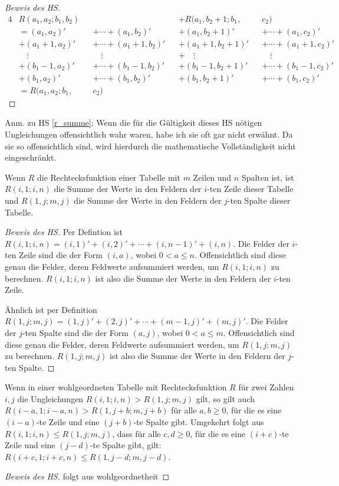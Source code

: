 \begin{proof}[Beweis des HS]
\begin{alignat*}{4}
        &R(a_1, a_2; b_1, b_2)&& &&+R(a_1, b_2+1; b_1, &&c_2)\\
        &=(a_1, a_2)' &&+\cdots+ (a_1, b_2)'
        &&+(a_1, b_2+1)'&&+\cdots+(a_1, c_2)'\\
        &+(a_1+1, a_2)'&&+\cdots+ (a_1+1, b_2)'
        &&+(a_1+1, b_2+1)'&&+\cdots+(a_1+1, c_2)'\\
        & \quad\vdots&&\quad\vdots&&+\quad\vdots&&\quad\vdots\\
        &+(b_1-1, a_2)'&&+\cdots + (b_1-1, b_2)'
        &&+(b_1-1, b_2+1)'&&+\cdots+(b_1-1, c_2)'\\
        &+(b_1, a_2)'&&+ \cdots + (b_1, b_2)'
        &&+(b_1, b_2+1)'&&+\cdots+(b_1, c_2)'\\
        &=R(a_1, a_2; b_1, &&c_2)
    \end{alignat*}
\end{proof}
Anm.  zu HS \ref{r_summe}: Wenn die für die Gültigkeit dieses HS nötigen Ungleichungen offensichtlich wahr waren, 
habe ich sie oft gar nicht erwähnt. Da sie so offensichtlich sind, wird hierdurch die mathematische Vollständigkeit 
nicht eingeschränkt.
\begin{lem}\label{r_zeile_spalte}
    Wenn $R$ die Rechtecksfunktion einer Tabelle mit $m$ Zeilen und $n$ Spalten ist, ist $R(i, 1; i, n)$ die Summe 
    der Werte in den Feldern der $i$-ten Zeile dieser Tabelle und $R(1, j; m, j)$ die Summe der Werte in den Feldern 
    der $j$-ten Spalte dieser Tabelle.
\end{lem}
\begin{proof}[Beweis des HS]
    Per Defintion ist $R(i, 1; i, n)=(i, 1)'+(i, 2)'+\cdots+(i, n-1)'+(i, n)$. Die Felder der $i$-ten Zeile sind die 
    der Form $(i, a)$, wobei $0<a\leq n$. Offensichtlich sind diese genau die Felder, deren Feldwerte aufsummiert 
    werden, um $R(i, 1; i, n)$ zu berechnen. $R(i, 1; i, n)$ ist also die Summe der Werte in den Feldern der $i$-ten 
    Zeile.

    Ähnlich ist per Definition $R(1, j; m, j)=(1, j)'+(2, j)'+\cdots+(m-1, j)'+(m, j)'$. Die Felder der $j$-ten Spalte 
    sind die der Form $(a, j)$, wobei $0<a\leq m$. Offensichtlich sind diese genau die Felder, deren Feldwerte 
    aufsummiert werden, um $R(1, j; m, j)$ zu berechnen. $R(1, j; m, j)$ ist also die Summe der Werte in den Feldern 
    der $j$-ten Spalte.
\end{proof}
\begin{lem}\label{mehr_nuller}
    Wenn in einer wohlgeordneten Tabelle mit Rechtecksfunktion $R$ für zwei Zahlen $i, j$ die Ungleichungen 
    $R(i, 1; i, n)>R(1, j; m, j)$ gilt, so gilt auch $R(i-a, 1; i-a, n)>R(1, j+b; m, j+b)$ für alle $a, b\geq0$, für 
    die es eine $(i-a)$-te Zeile und eine $(j+b)$-te Spalte gibt. Umgekehrt folgt aus $R(i, 1; i, n)\leq R(1, j; m, j)$, 
    dass für alle $c,d\geq0$, für die es eine $(i+c)$-te Zeile und  eine $(j-d)$-te Spalte gibt, gilt: 
    $R(i+c, 1; i+c, n)\leq R(1, j-d; m, j-d)$. 
\end{lem}
\begin{proof}[Beweis des HS]
    folgt aus wohlgeordnetheit %
\end{proof}

